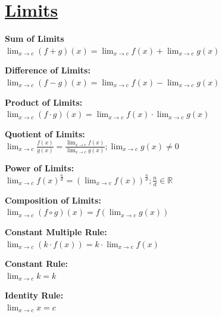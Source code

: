 \documentclass[12pt]{article}
\begin{document}
\section*{\underline{\textbf{Limits}}}
\begin{minipage}{\textwidth}
    \textbf{Sum of Limits}
    \\ \( \displaystyle\lim_{x \rightarrow{c}} {(f + g)(x)} = \displaystyle\lim_{x \rightarrow{c}} {f(x)} + \displaystyle\lim_{x \rightarrow{c}} {g(x)} \)
\end{minipage}
\begin{minipage}{\textwidth}
    \textbf{Difference of Limits:}
    \\ \( \displaystyle\lim_{x \rightarrow{c}} {(f - g)(x)} = \displaystyle\lim_{x \rightarrow{c}} {f(x)} - \displaystyle\lim_{x \rightarrow{c}} {g(x)} \)
\end{minipage}
\begin{minipage}{\textwidth}
    \textbf{Product of Limits:}   
    \\ \( \displaystyle\lim_{x \rightarrow{c}} {(f \cdot g)(x)} = \displaystyle\lim_{x \rightarrow{c}} {f(x)} \cdot \displaystyle\lim_{x \rightarrow{c}} {g(x)} \)
\end{minipage}
\begin{minipage}{\textwidth}
    \textbf{Quotient of Limits:}
    \\ \( \displaystyle\lim_{x \rightarrow{c}} {\displaystyle\frac{ f(x) }{ g(x) }} = \displaystyle\frac{ \displaystyle\lim_{x \rightarrow{c}} {f(x)} }{ \displaystyle\lim_{x \rightarrow{c}} {g(x)} } ; \displaystyle\lim_{x \rightarrow{c}} {g(x)} \ne 0 \)
\end{minipage}
\begin{minipage}{\textwidth}
    \textbf{Power of Limits:}
    \\ \( \displaystyle\lim_{x \rightarrow{c}} {f(x)^{\frac{ n }{ d }}} = (\displaystyle\lim_{x \rightarrow{c}} {f(x)})^{\frac{ n }{ d }} ; \displaystyle\frac{ n }{ d } \in \mathbb{R} \)
\end{minipage}
\begin{minipage}{\textwidth}
    \textbf{Composition of Limits:}
    \\ \( \displaystyle\lim_{x \rightarrow{c}} {(f \circ g)(x)} = f(\displaystyle\lim_{x \rightarrow{c}} {g(x)}) \)
\end{minipage}
\begin{minipage}{\textwidth}
    \textbf{Constant Multiple Rule:}
    \\ \( \displaystyle\lim_{x \rightarrow{c}} {(k \cdot f(x))} = k \cdot \displaystyle\lim_{x \rightarrow{c}} {f(x)} \)
\end{minipage}
\begin{minipage}{\textwidth}
    \textbf{Constant Rule:}
    \\ \( \displaystyle\lim_{x \rightarrow{c}} {k} = k \)
\end{minipage}
\begin{minipage}{\textwidth}
    \textbf{Identity Rule:}
    \\ \( \displaystyle\lim_{x \rightarrow{c}} {x} = c \)
\end{minipage}
\end{document}
